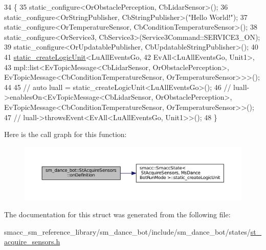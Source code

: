 \begin{DoxyCode}
34    \{
35       static\_configure<OrObstaclePerception, CbLidarSensor>();
36       static\_configure<OrStringPublisher, CbStringPublisher>(\textcolor{stringliteral}{"Hello World!"});
37       static\_configure<OrTemperatureSensor, CbConditionTemperatureSensor>();
38       static\_configure<OrService3, CbService3>(Service3Command::SERVICE3\_ON);
39       static\_configure<OrUpdatablePublisher, CbUpdatableStringPublisher>();
40 
41       \hyperlink{classsmacc_1_1SmaccState_a6fc90cf59c60c749e82f49aafb079b23}{static\_createLogicUnit}<LuAllEventsGo,
42                              EvAll<LuAllEventsGo, Unit1>,
43                              mpl::list<EvTopicMessage<CbLidarSensor, OrObstaclePerception>, 
      EvTopicMessage<CbConditionTemperatureSensor, OrTemperatureSensor>>>();
44 
45       \textcolor{comment}{// auto luall = static\_createLogicUnit<LuAllEventsGo>();}
46       \textcolor{comment}{// luall->enablesOn<EvTopicMessage<CbLidarSensor, OrObstaclePerception>,
       EvTopicMessage<CbConditionTemperatureSensor, OrTemperatureSensor>>();}
47       \textcolor{comment}{// luall->throwsEvent<EvAll<LuAllEventsGo, Unit1>>();}
48    \}
\end{DoxyCode}


Here is the call graph for this function\+:
\nopagebreak
\begin{figure}[H]
\begin{center}
\leavevmode
\includegraphics[width=350pt]{structsm__dance__bot_1_1StAcquireSensors_ae30f4b633faa922070fc8412b6dd78fc_cgraph}
\end{center}
\end{figure}




The documentation for this struct was generated from the following file\+:\begin{DoxyCompactItemize}
\item 
smacc\+\_\+sm\+\_\+reference\+\_\+library/sm\+\_\+dance\+\_\+bot/include/sm\+\_\+dance\+\_\+bot/states/\hyperlink{st__acquire__sensors_8h}{st\+\_\+acquire\+\_\+sensors.\+h}\end{DoxyCompactItemize}
